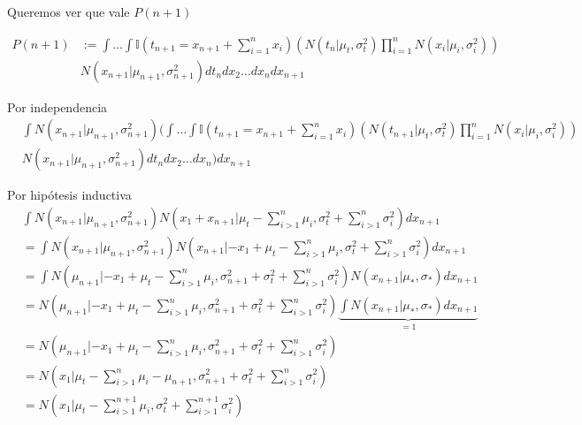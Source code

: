 \documentclass[11pt,twoside,spanish]{report} %
\begin{document}
Queremos ver que vale $P(n+1)$

\begin{equation}
	\begin{split}
		P(n+1) &:= \int \dots \int \mathbb{I}(t_{n+1}=  x_{n+1} + \sum_{i=1}^{n} x_i ) \left(N(t_n|\mu_t,\sigma_t^2) \prod_{i=1}^{n} N(x_i|\mu_i,\sigma_i^2) \right)\\
		& N(x_{n+1}|\mu_{n+1},\sigma_{n+1}^2) dt_ndx_2 \dots dx_{n} dx_{n+1}
	\end{split}
\end{equation}

Por independencia
\begin{equation}
	\begin{split}
		&\int N(x_{n+1}|\mu_{n+1},\sigma_{n+1}^2)\Big( \int \dots \int \mathbb{I}(t_{n+1}=  x_{n+1} + \sum_{i=1}^{n} x_i ) \left(N(t_{n+1}|\mu_t,\sigma_t^2) \prod_{i=1}^{n} N(x_i|\mu_i,\sigma_i^2) \right)\\
		& N(x_{n+1}|\mu_{n+1},\sigma_{n+1}^2) dt_ndx_2 \dots dx_{n} \Big) dx_{n+1}
	\end{split}
\end{equation}


Por hip\'otesis inductiva
\begin{equation}
	\begin{split}
		&\int N(x_{n+1}|\mu_{n+1},\sigma_{n+1}^2) N\left(x_1+x_{n+1}|\mu_t-\sum_{i>1}^n \mu_i,\sigma_t^2+\sum_{i>1}^n\sigma_i^2\right) dx_{n+1} \\
		&=\int N(x_{n+1}|\mu_{n+1},\sigma_{n+1}^2) N\left(x_{n+1}|-x_1+\mu_t-\sum_{i>1}^n \mu_i,\sigma_t^2+\sum_{i>1}^n\sigma_i^2\right) dx_{n+1} \\
		&=\int N(\mu_{n+1}|-x_1+\mu_t-\sum_{i>1}^n \mu_i,\sigma_{n+1}^2+\sigma_t^2+\sum_{i>1}^n\sigma_i^2) N\left(x_{n+1}|\mu_{\ast},\sigma_{\ast}\right) dx_{n+1} \\
		&= N(\mu_{n+1}|-x_1+\mu_t-\sum_{i>1}^n \mu_i,\sigma_{n+1}^2+\sigma_t^2+\sum_{i>1}^n\sigma_i^2) \underbrace{\int N\left(x_{n+1}|\mu_{\ast},\sigma_{\ast}\right) dx_{n+1}}_{=1} \\
		&= N(\mu_{n+1}|-x_1+\mu_t-\sum_{i>1}^n \mu_i,\sigma_{n+1}^2+\sigma_t^2+\sum_{i>1}^n\sigma_i^2)\\
		&= N(x_1|\mu_t-\sum_{i>1}^n \mu_i-\mu_{n+1},\sigma_{n+1}^2+\sigma_t^2+\sum_{i>1}^n\sigma_i^2)\\
		&= N(x_1|\mu_t-\sum_{i>1}^{n+1} \mu_i,\sigma_t^2+\sum_{i>1}^{n+1}\sigma_i^2)
	\end{split}
\end{equation}
\end{document}
